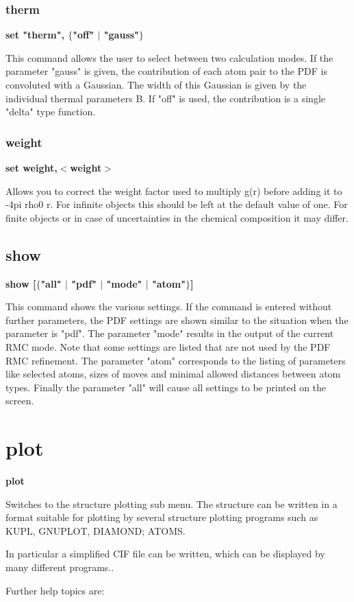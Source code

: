 \subsubsection{therm}
{\bf set "therm", $ \{$"off" $| $ "gauss"$\} $ \par }
\par
\vspace{3pt}
This command allows the user to select between two calculation 
modes. If the parameter "gauss" is given, the contribution of each 
atom pair to the PDF is convoluted with a Gaussian. The width of 
this Gaussian is given by the individual thermal parameters B. 
If "off" is used, the contribution is a single "delta" type function. 
\subsubsection{weight}
{\bf set weight,$ <$weight$> $ \par }
\par
\vspace{3pt}
Allows you to correct the weight factor used to multiply g(r) 
before adding it to -4pi rho0 r. For infinite objects this should 
be left at the default value of one. For finite objects or in case 
of uncertainties in the chemical composition it may differ. 
\subsection*{show}
{\bf show [$ \{$"all" $| $ "pdf" $| $ "mode" $| $ "atom"$\} $] \par }
\par
\vspace{3pt}
This command shows the various settings. If the command is entered 
without further parameters, the PDF settings are shown similar 
to the situation when the parameter is "pdf". The parameter 
"mode" results in the output of the current RMC mode. Note that 
some settings are listed that are not used by the PDF RMC refinement. 
The parameter "atom" corresponds to the listing of parameters like 
selected atoms, sizes of moves and minimal allowed distances between 
atom types. Finally the parameter "all" will cause all settings 
to be printed on the screen. 
\section{plot}
{\bf plot \par }
\par
\vspace{3pt}
Switches to the structure plotting sub menu. The structure can be 
written in a format suitable for plotting by several structure plotting 
programs such as KUPL, GNUPLOT, DIAMOND; ATOMS. 
\par
In particular a simplified CIF file can be written, which can be 
displayed by many different programs.. 
\par
Further help topics are: 
\par
